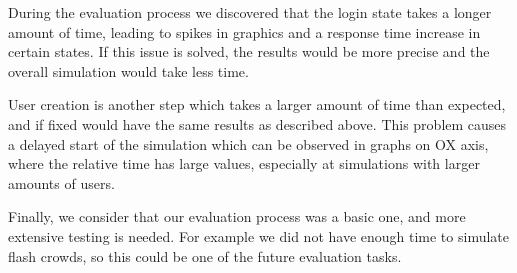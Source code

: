 During the evaluation process we discovered that the login state takes a longer amount of time, leading to spikes in graphics and a response time increase in certain states. If this issue is solved, the results would be more precise and the overall simulation would take less time.

User creation is another step which takes a larger amount of time than expected, and if fixed would have the same results as described above. This problem causes a delayed start of the simulation which can be observed in graphs on OX axis, where the relative time has large values, especially at simulations with larger amounts of users.

Finally, we consider that our evaluation process was a basic one, and more extensive testing is needed. For example we did not have enough time to simulate flash crowds, so this could be one of the future evaluation tasks.

